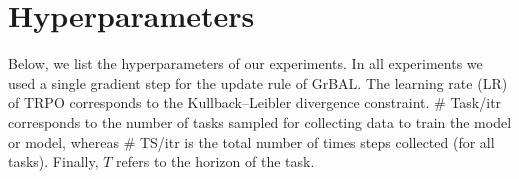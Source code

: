 \section{Hyperparameters}
Below, we list the hyperparameters of our experiments. In all experiments we used a single gradient step for the update rule of GrBAL. The learning rate (LR) of TRPO corresponds to the Kullback–Leibler divergence constraint. \# Task/itr corresponds to the number of tasks sampled for collecting data to train the model or model, whereas \# TS/itr is the total number of times steps collected (for all tasks). Finally, $T$ refers to the horizon of the task.
\begin{table}[H]
\centering
\caption{Hyperparameters for the half-cheetah tasks}
\label{tab:hc-hyper}
\end{table}


